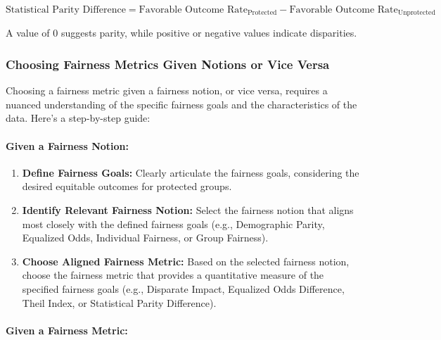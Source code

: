 \[
\text{Statistical Parity Difference} = \text{Favorable Outcome Rate}_{\text{Protected}} - \text{Favorable Outcome Rate}_{\text{Unprotected}}
\]

A value of 0 suggests parity, while positive or negative values indicate disparities.

\subsubsection{Choosing Fairness Metrics Given Notions or Vice Versa}

Choosing a fairness metric given a fairness notion, or vice versa, requires a nuanced understanding of the specific fairness goals and the characteristics of the data. Here's a step-by-step guide:

\paragraph{Given a Fairness Notion:}

\begin{enumerate}
 
    \item \textbf{Define Fairness Goals:} Clearly articulate the fairness goals, considering the desired equitable outcomes for protected groups.
 
    \item \textbf{Identify Relevant Fairness Notion:} Select the fairness notion that aligns most closely with the defined fairness goals (e.g., Demographic Parity, Equalized Odds, Individual Fairness, or Group Fairness).
 
    \item \textbf{Choose Aligned Fairness Metric:} Based on the selected fairness notion, choose the fairness metric that provides a quantitative measure of the specified fairness goals (e.g., Disparate Impact, Equalized Odds Difference, Theil Index, or Statistical Parity Difference).

\end{enumerate}

\paragraph{Given a Fairness Metric:}

